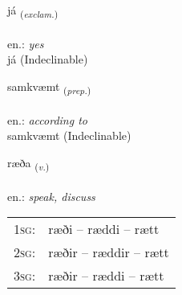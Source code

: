 \documentclass[frontgrid, backgrid]{flacards}\usepackage[]{graphicx}\usepackage[]{xcolor}
\begin{document}
{já \small{\textsubscript{(\textit{exclam.})}} \\[1ex]
\textphonetic{[jauː]} \\
en.: \emph{yes} \\  [2ex]
já (Indeclinable)}


\renewcommand{\flhead}{\vskip5pt \fboxsep=0pt {\small\bfseries\footnotesize Forsetning | Preposition}}
\renewcommand{\fcfoot}{\vskip5pt \fboxsep=0pt \hspace{2pt}{\small\bfseries\footnotesize 1K}}

\renewcommand{\blhead}{\vskip5pt {\small\bfseries\footnotesize Forsetning | Preposition }}
\renewcommand{\bcfoot}{\vskip5pt \hspace{2pt}{\small\bfseries\footnotesize 1K}}


{samkvæmt \small{\textsubscript{(\textit{prep.})}} \\[1ex]
\textphonetic{[samkʰvaim̥t]} \\
en.: \emph{according to} \\  [2ex]
samkvæmt (Indeclinable)}

\renewcommand{\flhead}{\vskip5pt \fboxsep=0pt {\small\bfseries\footnotesize Sagnorð | Verb}}
\renewcommand{\fcfoot}{\vskip5pt \fboxsep=0pt \hspace{2pt}{\small\bfseries\footnotesize 1K}}

\renewcommand{\blhead}{\vskip5pt {\small\bfseries\footnotesize Sagnorð | Verb }}
\renewcommand{\bcfoot}{\vskip5pt \hspace{2pt}{\small\bfseries\footnotesize 1K}}


{ræða \small{\textsubscript{(\textit{v.})}} \\[1ex] %
\textphonetic{[raiːða]} \\
en.: \emph{speak, discuss} \\  [2ex]
\renewcommand*{\arraystretch}{0.8}
\begin{tabular}{p{1cm}l}
\textsc{1sg}: & ræði -- ræddi -- rætt \\ 
\textsc{2sg}: & ræðir -- ræddir -- rætt \\ 
\textsc{3sg}: & ræðir -- ræddi -- rætt \\ 
\end{tabular}
}
\end{document}
